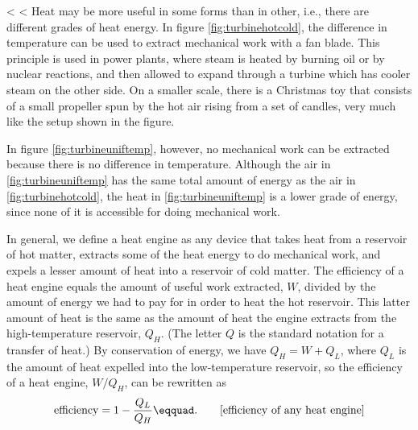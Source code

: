 <%
<%
Heat may be more useful in some forms than in other, i.e.,
there are different grades of heat energy. In figure \ref{fig:turbinehotcold},
the difference in temperature can be used to extract
mechanical work with a fan blade. This principle is used in
power plants, where steam is heated by burning oil or by
nuclear reactions, and then allowed to expand through a
turbine which has cooler steam on the other side. On a
smaller scale, there is a Christmas toy that consists of a
small propeller spun by the hot air rising from a set of
candles, very much like the setup shown in the figure.

In figure \ref{fig:turbineuniftemp}, however, no mechanical work can be extracted
because there is no difference in temperature. Although the
air in \ref{fig:turbineuniftemp} has the same total amount of energy as the air in
\ref{fig:turbinehotcold}, the heat in \ref{fig:turbineuniftemp} is a lower grade of energy, since
none of it is accessible for doing mechanical work.

In general, we define a heat engine as any device that takes
heat from a reservoir of hot matter, extracts some of the
heat energy to do mechanical work, and expels a lesser
amount of heat into a reservoir of cold matter. The
efficiency of a heat engine equals the amount of useful work
extracted, $W$, divided by the amount of energy we had to pay
for in order to heat the hot reservoir. This latter amount
of heat is the same as the amount of heat the engine
extracts from the high-temperature reservoir, $Q_H$. (The
letter $Q$ is the standard notation for a transfer of heat.)
By conservation of energy, we have $Q_H=W+Q_L$, where $Q_L$ is the
amount of heat expelled into the low-temperature reservoir,
so the efficiency of a heat engine, $W/Q_H$, can be rewritten
as
\begin{equation*}
        \text{efficiency}        =  1-\frac{Q_L}{Q_H}\eqquad. \qquad \text{[efficiency of any heat
engine]}
\end{equation*}


